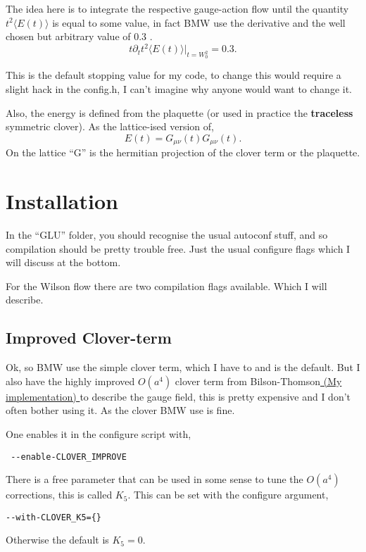 \documentclass[12pt]{article}
\begin{document}
The idea here is to integrate the respective gauge-action flow until the quantity $t^2\langle E(t) \rangle$ is equal to
some value, in fact BMW use the derivative and the well chosen but arbitrary value of 0.3 \cite{Borsanyi:2012zs}.
\begin{equation}
t \partial_t t^2 \langle E(t) \rangle|_{t=W_0^2} = 0.3.
\end{equation}

This is the default stopping value for my code, to change this would require a slight hack in the config.h, I can't
imagine why anyone would want to change it.

Also, the energy is defined from the plaquette (or used in practice the \textbf{traceless} symmetric clover). As the lattice-ised version
of,
\begin{equation}
 E(t) = G_{\mu\nu}(t) G_{\mu\nu}(t). \nonumber
\end{equation}
On the lattice ``G'' is the hermitian projection of the clover term or the plaquette.
 
\section{Installation}

In the ``GLU'' folder, you should recognise the usual autoconf stuff, and so compilation should be pretty trouble free.
Just the usual configure flags which I will discuss at the bottom.

For the Wilson flow there are two compilation flags available. Which I will describe.

\subsection{Improved Clover-term}

Ok, so BMW use the simple clover term, which I have to and is the default. But I also have the highly improved $O(a^4)$
clover term from
Bilson-Thomson\cite{BilsonThompson:2002jk}\href{http://arxiv.org/abs/hep-lat/0203008}{ (My
implementation) } to describe the gauge field, this is pretty expensive and I don't often bother using it. As the clover
BMW use is fine.

One enables it in the configure script with,
\begin{verbatim}
 --enable-CLOVER_IMPROVE
\end{verbatim}

There is a free parameter that can be used in some sense to tune the $O(a^4)$ corrections, this is called $K_5$. This can be set with the configure argument,
\begin{verbatim}
--with-CLOVER_K5={}
\end{verbatim}
Otherwise the default is $K_5=0$.
\end{document}
